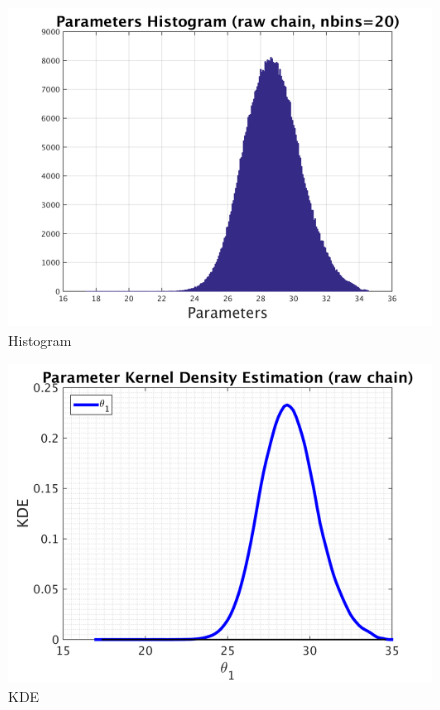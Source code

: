 \begin{figure}[H]
  
  \centering
   \includegraphics[scale=0.75]{53_results/output_10/simple_ip_hist_raw}
   \caption{Histogram}
\end{figure}



\begin{figure}[H]
  
  \centering
   \includegraphics[scale=0.75]{53_results/output_10/simple_ip_kde_raw}
   \caption{ KDE }
\end{figure}

